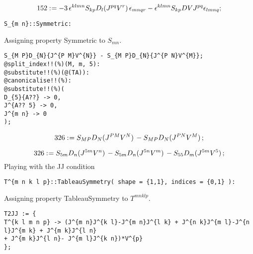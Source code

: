 \documentclass[11pt]{article}
\def\specialcolon{\mathrel{\mathop{:}}\hspace{-.5em}}
\begin{document}
\begin{dmath*}[compact, spread=2pt]
152\specialcolon{}=  - 3\, {\epsilon}^{k l m n} {S}_{k p} {D}_{l}{({J}^{p q} {V}^{r})}\,  {\epsilon}_{m n q r} - {\epsilon}^{k l m n} {S}_{k p} DV {J}^{p q} {\epsilon}_{l m n q};
\end{dmath*}
{\color[named]{Blue}\begin{verbatim}
S_{m n}::Symmetric:
\end{verbatim}}
Assigning property Symmetric to ${S}_{m n}$.
\\
{\color[named]{Blue}\begin{verbatim}
S_{M P}D_{N}{J^{P M}V^{N}} - S_{M P}D_{N}{J^{P N}V^{M}};
@split_index!!(%)(M, m, 5):
@substitute!!(%)(@(TA)):
@canonicalise!!(%):
@substitute!!(%)(
D_{5}{A??} -> 0,
J^{A?? 5} -> 0,
J^{m n} -> 0
);
\end{verbatim}}







\begin{dmath*}[compact, spread=2pt]
326\specialcolon{}= {S}_{M P} {D}_{N}{({J}^{P M} {V}^{N})}\,  - {S}_{M P} {D}_{N}{({J}^{P N} {V}^{M})}\, ;
\end{dmath*}







\begin{dmath*}[compact, spread=2pt]
326\specialcolon{}= {S}_{5 m} {D}_{n}{({J}^{5 m} {V}^{n})}\,  - {S}_{5 m} {D}_{n}{({J}^{5 n} {V}^{m})}\,  - {S}_{5 5} {D}_{m}{({J}^{5 m} {V}^{5})}\, ;
\end{dmath*}
Playing with the JJ condition
{\color[named]{Blue}\begin{verbatim}
T^{m n k l p}::TableauSymmetry( shape = {1,1}, indices = {0,1} ):
\end{verbatim}}
Assigning property TableauSymmetry to ${T}^{m n k l p}$.
\\
{\color[named]{Blue}\begin{verbatim}
T2JJ := {
T^{k l m n p} -> (J^{m n}J^{k l}-J^{m n}J^{l k} + J^{n k}J^{m l}-J^{n l}J^{m k} + J^{m k}J^{l n}
+ J^{m k}J^{l n}- J^{m l}J^{k n})*V^{p}
};
\end{verbatim}}
\end{document}
